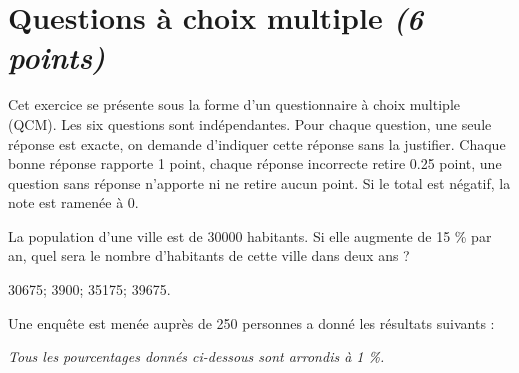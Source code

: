 
\section{Questions à choix multiple \textit{(6 points)}}

Cet exercice se présente sous la forme d'un questionnaire à choix multiple (QCM). Les six questions sont indépendantes. Pour chaque question, une seule réponse est exacte, on demande d'indiquer cette réponse sans la justifier. Chaque bonne réponse rapporte 1 point, chaque réponse incorrecte retire \num{0.25} point, une question sans réponse n'apporte ni ne retire aucun point. Si le total est négatif, la note est ramenée à 0.

\begin{questions}
	\question[1] La population d'une ville est de \num{30000} habitants. Si elle augmente de 15 \% par an, quel sera le nombre d'habitants de cette ville dans deux ans ?
	
	\begin{oneparcheckboxes}
		\choice \num{30675};
		\choice \num{3900};
		\choice \num{35175};
		\CorrectChoice \num{39675}.
	\end{oneparcheckboxes} 

	\question[4] Une enquête est menée auprès de 250 personnes a donné les résultats suivants :
	
	\emph{Tous les pourcentages donnés ci-dessous sont 	arrondis à 1 \%.}
\end{questions}
